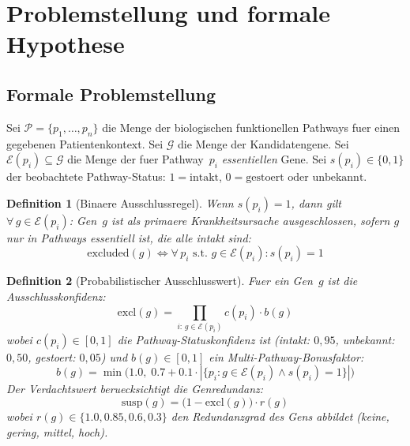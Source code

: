 \documentclass[12pt,a4paper]{article}
\newtheorem{definition}{Definition}
\begin{document}
\section*{Problemstellung und formale Hypothese}
\label{de:sec:problem}

\subsection*{Formale Problemstellung}

Sei $\mathcal{P} = \{p_1, \ldots, p_n\}$ die Menge der biologischen funktionellen Pathways fuer einen gegebenen Patientenkontext. Sei $\mathcal{G}$ die Menge der Kandidatengene. Sei $\mathcal{E}(p_i) \subseteq \mathcal{G}$ die Menge der fuer Pathway~$p_i$ \emph{essentiellen} Gene. Sei $s(p_i) \in \{0, 1\}$ der beobachtete Pathway-Status: $1 = \text{intakt}$, $0 = \text{gestoert oder unbekannt}$.

\begin{definition}[Binaere Ausschlussregel]
\label{de:def:binary}
Wenn $s(p_i) = 1$, dann gilt $\forall\, g \in \mathcal{E}(p_i)$: Gen~$g$ ist als primaere Krankheitsursache \emph{ausgeschlossen}, sofern $g$ nur in Pathways essentiell ist, die alle intakt sind:
\begin{equation}
    \text{excluded}(g) \iff \forall\, p_i \text{ s.t. } g \in \mathcal{E}(p_i): s(p_i) = 1
\end{equation}
\end{definition}

\begin{definition}[Probabilistischer Ausschlusswert]
\label{de:def:probabilistic}
Fuer ein Gen~$g$ ist die Ausschlusskonfi\-denz:
\begin{equation}
    \text{excl}(g) = \prod_{i:\, g \in \mathcal{E}(p_i)} c(p_i) \cdot b(g)
\end{equation}
wobei $c(p_i) \in [0,1]$ die Pathway-Statuskonfidenz ist (intakt: $0{,}95$, unbekannt: $0{,}50$, gestoert: $0{,}05$) und $b(g) \in [0,1]$ ein Multi-Pathway-Bonusfaktor:
\begin{equation}
    b(g) = \min\!\Big(1.0,\; 0.7 + 0.1 \cdot |\{p_i : g \in \mathcal{E}(p_i) \wedge s(p_i) = 1\}|\Big)
\end{equation}
Der \emph{Verdachtswert} beruecksichtigt die Genredundanz:
\begin{equation}
    \text{susp}(g) = \big(1 - \text{excl}(g)\big) \cdot r(g)
\end{equation}
wobei $r(g) \in \{1.0, 0.85, 0.6, 0.3\}$ den Redundanzgrad des Gens abbildet (keine, gering, mittel, hoch).
\end{definition}
\end{document}
